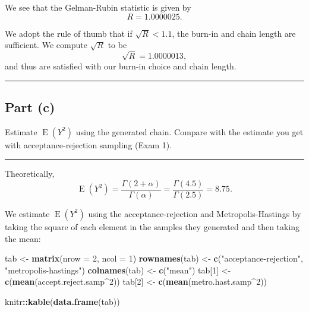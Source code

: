 \documentclass[
  11pt,
]{paper}
\newenvironment{Shaded}{\begin{snugshade}}{\end{snugshade}}
\newcommand{\AttributeTok}[1]{\textcolor[rgb]{0.13,0.29,0.53}{#1}}
\newcommand{\DecValTok}[1]{\textcolor[rgb]{0.00,0.00,0.81}{#1}}
\newcommand{\FunctionTok}[1]{\textcolor[rgb]{0.13,0.29,0.53}{\textbf{#1}}}
\newcommand{\NormalTok}[1]{#1}
\newcommand{\OtherTok}[1]{\textcolor[rgb]{0.56,0.35,0.01}{#1}}
\newcommand{\SpecialCharTok}[1]{\textcolor[rgb]{0.81,0.36,0.00}{\textbf{#1}}}
\newcommand{\StringTok}[1]{\textcolor[rgb]{0.31,0.60,0.02}{#1}}
\begin{document}
We see that the Gelman-Rubin statistic is given by \[
  R = 1.0000025.
\]

We adopt the rule of thumb that if \(\sqrt{R} < 1.1\), the burn-in and
chain length are sufficient. We compute \(\sqrt{R}\) to be \[
  \sqrt{R} = 1.0000013,
\] and thus are satisfied with our burn-in choice and chain length.

\begin{center}\rule{0.5\linewidth}{0.5pt}\end{center}

\hypertarget{part-c}{%
\subsection{Part (c)}\label{part-c}}

Estimate \(\operatorname{E}(Y^2)\) using the generated chain. Compare
with the estimate you get with acceptance-rejection sampling (Exam 1).

\begin{center}\rule{0.5\linewidth}{0.5pt}\end{center}

Theoretically, \[
  \operatorname{E}(Y^2) = \frac{\Gamma(2+\alpha)}{\Gamma(\alpha)} = \frac{\Gamma(4.5)}{\Gamma(2.5)} = 8.75.
\]

We estimate \(\operatorname{E}(Y^2)\) using the acceptance-rejection and
Metropolis-Hastings by taking the square of each element in the samples
they generated and then taking the mean:

\begin{Shaded}
\begin{Highlighting}[]
\NormalTok{tab }\OtherTok{\textless{}{-}} \FunctionTok{matrix}\NormalTok{(}\AttributeTok{nrow =} \DecValTok{2}\NormalTok{, }\AttributeTok{ncol =} \DecValTok{1}\NormalTok{)}
\FunctionTok{rownames}\NormalTok{(tab) }\OtherTok{\textless{}{-}} \FunctionTok{c}\NormalTok{(}\StringTok{"acceptance{-}rejection"}\NormalTok{, }\StringTok{"metropolis{-}hastings"}\NormalTok{)}
\FunctionTok{colnames}\NormalTok{(tab) }\OtherTok{\textless{}{-}} \FunctionTok{c}\NormalTok{(}\StringTok{"mean"}\NormalTok{)}
\NormalTok{tab[}\DecValTok{1}\NormalTok{] }\OtherTok{\textless{}{-}} \FunctionTok{c}\NormalTok{(}\FunctionTok{mean}\NormalTok{(accept.reject.samp}\SpecialCharTok{\^{}}\DecValTok{2}\NormalTok{))}
\NormalTok{tab[}\DecValTok{2}\NormalTok{] }\OtherTok{\textless{}{-}} \FunctionTok{c}\NormalTok{(}\FunctionTok{mean}\NormalTok{(metro.hast.samp}\SpecialCharTok{\^{}}\DecValTok{2}\NormalTok{))}

\NormalTok{knitr}\SpecialCharTok{::}\FunctionTok{kable}\NormalTok{(}\FunctionTok{data.frame}\NormalTok{(tab))}
\end{Highlighting}
\end{Shaded}
\end{document}
